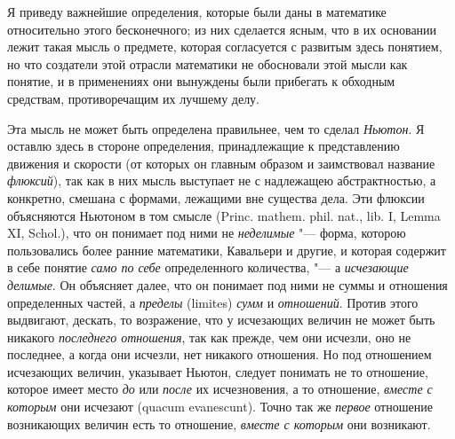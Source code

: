 Я приведу важнейшие определения, которые были даны в математике относительно
этого бесконечного; из них сделается ясным, что в их основании лежит такая
мысль о предмете, которая согласуется с развитым здесь понятием, но что
создатели этой отрасли математики не обосновали этой мысли как понятие, и в
применениях они вынуждены были прибегать к обходным средствам,
противоречащим их лучшему делу.

Эта мысль не может быть определена правильнее, чем то сделал
{\em Ньютон}. Я оставлю здесь в стороне определения,
принадлежащие к представлению движения и скорости (от которых он главным
образом и заимствовал название {\em флюксий}), так как
в них мысль выступает не с надлежащею абстрактностью, а конкретно, смешана
с формами, лежащими вне существа дела. Эти флюксии объясняются Ньютоном в
том смысле
(Princ. mathem. phil. nat., lib. I, Lemma XI, Schol.),
что он понимает под ними не
{\em неделимые} "--- форма, которою пользовались более
ранние математики, Кавальери и другие, и которая содержит в себе понятие
{\em само по себе} определенного количества, "--- а
{\em исчезающие делимые}. Он объясняет далее, что он
понимает под ними не суммы и отношения определенных частей, а
{\em пределы} (limites) {\em сумм}
и {\em отношений}. Против этого выдвигают, дескать, то
возражение, что у исчезающих величин не может быть никакого
{\em последнего отношения}, так как прежде, чем они
исчезли, оно не последнее, а когда они исчезли, нет никакого отношения. Но
под отношением исчезающих величин, указывает Ньютон, следует понимать не то
отношение, которое имеет место {\em до} или
{\em после} их исчезновения, а то отношение,
{\em вместе с которым} они исчезают (quacum
evanescunt). Точно так же {\em первое} отношение
возникающих величин есть то отношение, {\em вместе с
которым} они возникают.


